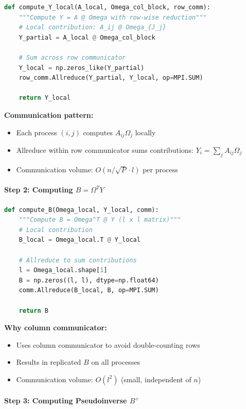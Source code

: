 \documentclass[11pt,a4paper]{article}
\begin{document}
\begin{lstlisting}[language=Python, caption={Distributed matrix-matrix multiplication}]
def compute_Y_local(A_local, Omega_col_block, row_comm):
    """Compute Y = A @ Omega with row-wise reduction"""
    # Local contribution: A_ij @ Omega_{J_j}
    Y_partial = A_local @ Omega_col_block
    
    # Sum across row communicator
    Y_local = np.zeros_like(Y_partial)
    row_comm.Allreduce(Y_partial, Y_local, op=MPI.SUM)
    
    return Y_local
\end{lstlisting}

\textbf{Communication pattern:}
\begin{itemize}
    \item Each process $(i,j)$ computes $A_{ij} \Omega_j$ locally
    \item Allreduce within row communicator sums contributions: $Y_i = \sum_{j} A_{ij} \Omega_j$
    \item Communication volume: $O(n/\sqrt{P} \cdot l)$ per process
\end{itemize}

\paragraph{Step 2: Computing $B = \Omega^T Y$}

\begin{lstlisting}[language=Python, caption={Small matrix formation via Allreduce}]
def compute_B(Omega_local, Y_local, comm):
    """Compute B = Omega^T @ Y (l x l matrix)"""
    # Local contribution
    B_local = Omega_local.T @ Y_local
    
    # Allreduce to sum contributions
    l = Omega_local.shape[1]
    B = np.zeros((l, l), dtype=np.float64)
    comm.Allreduce(B_local, B, op=MPI.SUM)
    
    return B
\end{lstlisting}

\textbf{Why column communicator:}
\begin{itemize}
    \item Uses column communicator to avoid double-counting rows
    \item Results in replicated $B$ on all processes
    \item Communication volume: $O(l^2)$ (small, independent of $n$)
\end{itemize}

\paragraph{Step 3: Computing Pseudoinverse $B^+$}
\end{document}
